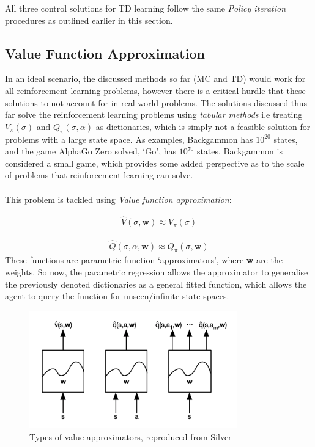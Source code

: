 \documentclass[ %
                    author={Ashwinder Khurana},
                supervisor={Prof Dave Cliff},
                    degree={MEng},
                     title={The Deeply Reinforced Trader},
                  subtitle={},
                      type={enterprise},
                      year={2020} ]{dissertation}
\begin{document}
{\noindent
All three control solutions for TD learning follow the same \textit{Policy iteration} procedures as outlined earlier in this section. 

\subsection{Value Function Approximation}
\label{subsection:value-function-approx}
In an ideal scenario, the discussed methods so far (MC and TD) would work for all reinforcement learning problems, however there is a critical hurdle that these solutions to not account for in real world problems. The solutions discussed thus far solve the reinforcement learning problems using \textit{tabular methods} i.e treating $V_\pi(\sigma)$ and $Q_\pi(\sigma, \alpha)$ as dictionaries, which is simply not a feasible solution for problems with a large state space. As examples, Backgammon has $10^{20}$ states, and the game AlphaGo Zero solved, \enquote*{Go}, has $10^{70}$ states. Backgammon is considered a small game, which provides some added perspective as to the scale of problems that reinforcement learning can solve. 
\\
\\
\noindent
This problem is tackled using \textit{Value function approximation}:

\begin{equation}
\label{value-approx}
\begin{split}
\hat{V}(\sigma, \textbf{w}) \approx V_\pi(\sigma)
\end{split}
\end{equation}

\begin{equation}
\label{action-value-approx}
\begin{split}
\hat{Q}(\sigma,\alpha, \textbf{w}) \approx Q_\pi(\sigma, \textbf{w})
\end{split}
\end{equation}
\noindent
These functions are parametric function \enquote*{approximators}, where \textbf{w} are the weights. So now, the parametric regression allows the approximator to generalise the previously denoted dictionaries as a general fitted function, which allows the agent to query the function for unseen/infinite state spaces. 


\begin{figure}[H]
  
	\centering
  	\includegraphics[width=0.8\textwidth]{value-approximators.png}
  	\caption{Types of value approximators, reproduced from Silver \cite{https://www.davidsilver.uk/wp-content/uploads/2020/03/FA.pdf}}
	 \label{fig:Approximators}


\end{figure}}
\end{document}
